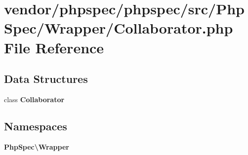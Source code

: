 \section{vendor/phpspec/phpspec/src/\+Php\+Spec/\+Wrapper/\+Collaborator.php File Reference}
\label{_collaborator_8php}
\subsection*{Data Structures}
\begin{DoxyCompactItemize}
\item 
class {\bf Collaborator}
\end{DoxyCompactItemize}
\subsection*{Namespaces}
\begin{DoxyCompactItemize}
\item 
 {\bf Php\+Spec\textbackslash{}\+Wrapper}
\end{DoxyCompactItemize}
